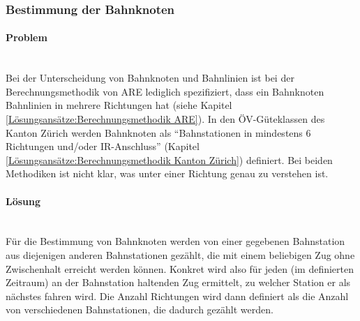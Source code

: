 \subsubsection{Bestimmung der Bahnknoten}
\label{Verbesserungsmöglichkeiten:Bestimmung der Bahnknoten}

\paragraph{Problem}~\\
Bei der Unterscheidung von Bahnknoten und Bahnlinien ist bei der Berechnungsmethodik von ARE lediglich spezifiziert, dass ein Bahnknoten Bahnlinien in mehrere Richtungen hat (siehe Kapitel \ref{Lösungsansätze:Berechnungsmethodik ARE}).
In den ÖV-Güteklassen des Kanton Zürich werden Bahnknoten als "`Bahnstationen in mindestens 6 Richtungen und/oder IR-Anschluss"' (Kapitel \ref{Lösungsansätze:Berechnungsmethodik Kanton Zürich}) definiert.
Bei beiden Methodiken ist nicht klar, was unter einer Richtung genau zu verstehen ist.

\paragraph{Lösung}~\\
Für die Bestimmung von Bahnknoten werden von einer gegebenen Bahnstation aus diejenigen anderen Bahnstationen gezählt, die mit einem beliebigen Zug ohne Zwischenhalt erreicht werden können.
Konkret wird also für jeden (im definierten Zeitraum) an der Bahnstation haltenden Zug ermittelt, zu welcher Station er als nächstes fahren wird.
Die Anzahl Richtungen wird dann definiert als die Anzahl von verschiedenen Bahnstationen, die dadurch gezählt werden.
